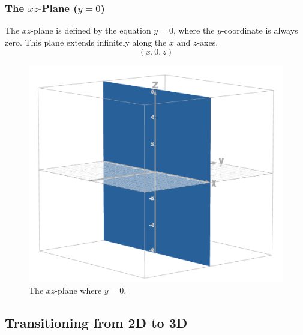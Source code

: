 \documentclass{article}
\begin{document}
\begin{conceptbox}
\begin{blankbox}
        \subsubsection*{The \( xz \)-Plane (\( y = 0 \))}
        \begin{minipage}{0.4\textwidth}
            The \( xz \)-plane is defined by the equation \( y = 0 \), where the \( y \)-coordinate is always zero. 
            This plane extends infinitely along the \( x \) and \( z \)-axes.
            \[
                (x, 0, z)
            \]
        \end{minipage}
        \begin{minipage}{0.5\textwidth}
            \begin{figure}[H]
                \centering
                \includegraphics[width=\textwidth]{xz plane.png}
                \caption{The \( xz \)-plane where \( y = 0 \).}
                \label{fig:xz_plane}
            \end{figure}
        \end{minipage}
    \end{blankbox}
    
\end{conceptbox}    

\subsection*{Transitioning from 2D to 3D}
\end{document}

